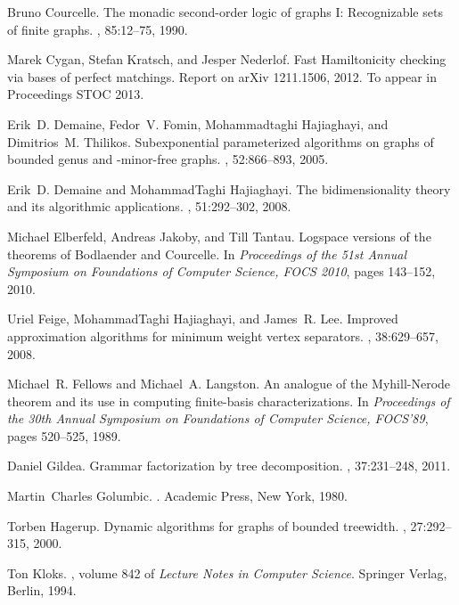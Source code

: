 \documentclass[a4paper,11pt]{article}
\theoremstyle{definition}
\theoremstyle{remark}
\begin{document}
\begin{thebibliography}{10}
Bruno Courcelle.
\newblock The monadic second-order logic of graphs {I}: {R}ecognizable sets of
  finite graphs.
, 85:12--75, 1990.

Marek Cygan, Stefan Kratsch, and Jesper Nederlof.
\newblock Fast {H}amiltonicity checking via bases of perfect matchings.
\newblock Report on arXiv 1211.1506, 2012.
\newblock To appear in Proceedings STOC 2013.

Erik~D. Demaine, Fedor~V. Fomin, Mohammadtaghi Hajiaghayi, and Dimitrios~M.
  Thilikos.
\newblock Subexponential parameterized algorithms on graphs of bounded genus
  and {}-minor-free graphs.
, 52:866--893, 2005.

Erik~D. Demaine and MohammadTaghi Hajiaghayi.
\newblock The bidimensionality theory and its algorithmic applications.
, 51:292--302, 2008.

Michael Elberfeld, Andreas Jakoby, and Till Tantau.
\newblock Logspace versions of the theorems of {B}odlaender and {C}ourcelle.
\newblock In {\em Proceedings of the 51st Annual Symposium on Foundations of
  Computer Science, FOCS 2010}, pages 143--152, 2010.

Uriel Feige, MohammadTaghi Hajiaghayi, and James~R. Lee.
\newblock Improved approximation algorithms for minimum weight vertex
  separators.
, 38:629--657, 2008.

Michael~R. Fellows and Michael~A. Langston.
\newblock An analogue of the {M}yhill-{N}erode theorem and its use in computing
  finite-basis characterizations.
\newblock In {\em Proceedings of the 30th Annual Symposium on Foundations of
  Computer Science, FOCS'89}, pages 520--525, 1989.

Daniel Gildea.
\newblock Grammar factorization by tree decomposition.
, 37:231--248, 2011.

Martin~Charles Golumbic.
.
\newblock Academic Press, New York, 1980.

Torben Hagerup.
\newblock Dynamic algorithms for graphs of bounded treewidth.
, 27:292--315, 2000.

Ton Kloks.
, volume 842 of {\em
  Lecture Notes in Computer Science}.
\newblock Springer Verlag, Berlin, 1994.


\end{thebibliography}
\end{document}

